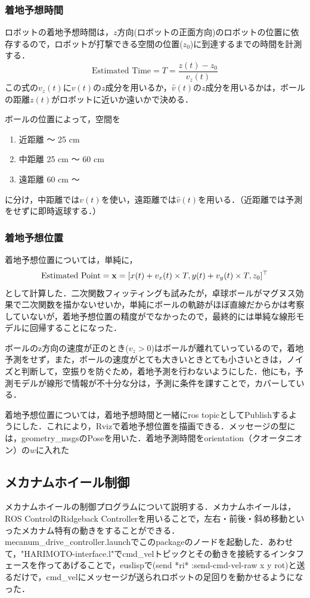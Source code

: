 \documentclass[10pt, oneside, titlepage]{ltjarticle}  %
\begin{document}
    \subsubsection{着地予想時間}
    ロボットの着地予想時間は，$z$方向(ロボットの正面方向)のロボットの位置に依存するので，ロボットが打撃できる空間の位置($z_0$)に到達するまでの時間を計測する．
    \[\mbox{Estimated Time} = T = \frac{z(t)-z_0}{v_z(t)}\]
    この式の$v_z(t)$に$v(t)$の$z$成分を用いるか，$\hat{v}(t)$の$z$成分を用いるかは，ボールの距離$z(t)$がロボットに近いか遠いかで決める．

    ボールの位置によって，空間を
    \begin{enumerate}
    \item 近距離 〜 25 cm
    \item 中距離 25 cm 〜 60 cm
    \item 遠距離 60 cm 〜
    \end{enumerate}
    に分け，中距離では$v(t)$を使い，遠距離では$\hat{v}(t)$を用いる．（近距離では予測をせずに即時返球する．）

    \subsubsection{着地予想位置}
    着地予想位置については，単純に，
    \[\mbox{Estimated Point} = {\bf x} = [x(t)+v_x(t)\times T, y(t)+v_y(t)\times T, z_0]^\top\]
    として計算した．二次関数フィッティングも試みたが，卓球ボールがマグヌス効果で二次関数を描かないせいか，単純にボールの軌跡がほぼ直線だからかは考察していないが，着地予想位置の精度がでなかったので，最終的には単純な線形モデルに回帰することになった．

    ボールのz方向の速度が正のとき($v_z>0$)はボールが離れていっているので，着地予測をせず，また，ボールの速度がとても大きいときとても小さいときは，ノイズと判断して，空振りを防ぐため，着地予測を行わないようにした．他にも，予測モデルが線形で情報が不十分な分は，予測に条件を課すことで，カバーしている．

    着地予想位置については，着地予想時間と一緒にros topicとしてPublishするようにした．これにより，Rvizで着地予想位置を描画できる．メッセージの型には，geometry\_msgsのPoseを用いた．着地予測時間をorientation（クオータニオン）の$w$に入れた

  \subsection{メカナムホイール制御}
  メカナムホイールの制御プログラムについて説明する．メカナムホイールは，ROS ControlのRidgeback Controllerを用いることで，左右・前後・斜め移動といったメカナム特有の動きをすることができる\cite{mecanum}．mecanum\_drive\_controller.launchでこのpackageのノードを起動した．あわせて，"HARIMOTO-interface.l"でcmd\_velトピックとその動きを接続するインタフェースを作ってあげることで，euslispで(send *ri* :send-cmd-vel-raw x y rot)と送るだけで，cmd\_velにメッセージが送られロボットの足回りを動かせるようになった．
\end{document}
